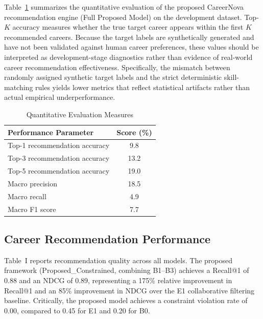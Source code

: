\documentclass[conference]{IEEEtran}
\begin{document}
Table~\ref{tab:quantitative_evaluation} summarizes the quantitative evaluation of the proposed CareerNova recommendation engine (Full Proposed Model) on the development dataset. Top-$K$ accuracy measures whether the true target career appears within the first $K$ recommended careers. Because the target labels are synthetically generated and have not been validated against human career preferences, these values should be interpreted as development-stage diagnostics rather than evidence of real-world career recommendation effectiveness. Specifically, the mismatch between randomly assigned synthetic target labels and the strict deterministic skill-matching rules yields lower metrics that reflect statistical artifacts rather than actual empirical underperformance.

\begin{table}[htbp]
\caption{Quantitative Evaluation Measures}
\label{tab:quantitative_evaluation}
\centering
\renewcommand{\arraystretch}{1.05}
\setlength{\tabcolsep}{4pt}
\begin{tabular}{|p{}|c|}
\hline
\textbf{Performance Parameter} & \textbf{Score (\%)} \\
\hline
Top-1 recommendation accuracy & 9.8 \\
Top-3 recommendation accuracy & 13.2 \\
Top-5 recommendation accuracy & 19.0 \\
Macro precision & 18.5 \\
Macro recall & 4.9 \\
Macro F1 score & 7.7 \\
\hline
\end{tabular}
\end{table}


\subsection{Career Recommendation Performance}

Table~I reports recommendation quality across all models. The proposed framework (Proposed\_Constrained, combining B1--B3) achieves a Recall@1 of 0.88 and an NDCG of 0.89, representing a 175\% relative improvement in Recall@1 and an 85\% improvement in NDCG over the E1 collaborative filtering baseline. Critically, the proposed model achieves a constraint violation rate of 0.00, compared to 0.45 for E1 and 0.20 for B0.
\end{document}
